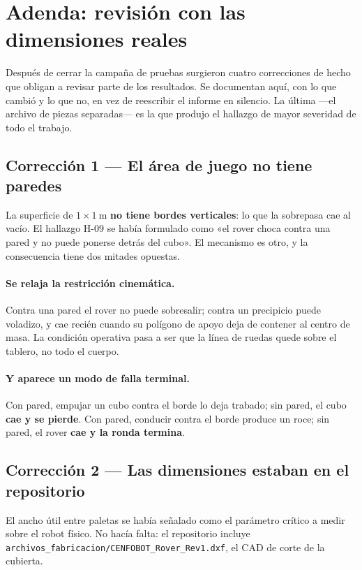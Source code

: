 \documentclass[11pt,a4paper]{article}
\begin{document}
\newpage
\section{Adenda: revisión con las dimensiones reales}
\label{sec:adenda}

Después de cerrar la campaña de pruebas surgieron cuatro correcciones de hecho que
obligan a revisar parte de los resultados. Se documentan aquí, con lo que cambió y lo que
no, en vez de reescribir el informe en silencio. La última ---el archivo de piezas
separadas--- es la que produjo el hallazgo de mayor severidad de todo el trabajo.

\subsection{Corrección 1 --- El área de juego no tiene paredes}

La superficie de $1\times1\ \mathrm{m}$ \textbf{no tiene bordes verticales}: lo que la
sobrepasa cae al vacío. El hallazgo H-09 se había formulado como «el rover choca contra
una pared y no puede ponerse detrás del cubo». El mecanismo es otro, y la consecuencia
tiene dos mitades opuestas.

\paragraph{Se relaja la restricción cinemática.} Contra una pared el rover no puede
sobresalir; contra un precipicio puede voladizo, y cae recién cuando su polígono de
apoyo deja de contener al centro de masa. La condición operativa pasa a ser que la
línea de ruedas quede sobre el tablero, no todo el cuerpo.

\paragraph{Y aparece un modo de falla terminal.} Con pared, empujar un cubo contra el
borde lo deja trabado; sin pared, el cubo \textbf{cae y se pierde}. Con pared, conducir
contra el borde produce un roce; sin pared, el rover \textbf{cae y la ronda termina}.

\subsection{Corrección 2 --- Las dimensiones estaban en el repositorio}

El ancho útil entre paletas se había señalado como el parámetro crítico a medir sobre el
robot físico. No hacía falta: el repositorio incluye
\texttt{archivos\_fabricacion/CENFOBOT\_Rover\_Rev1.dxf}, el CAD de corte de la cubierta.
\end{document}
